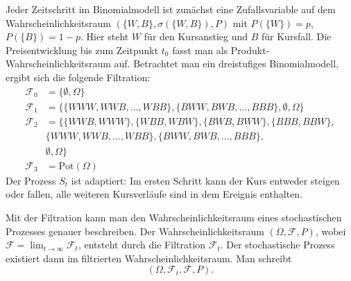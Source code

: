 \begin{bsp}
Jeder Zeitschritt im Binomialmodell ist zunächst eine Zufallsvariable auf dem 
Wahrscheinlichkeitsraum $(\{W, B\}, \sigma(\{W, B\}), P)$ mit 
$P(\{W \}) = p$, $P(\{B \}) = 1-p$. Hier steht $W$ für den Kursanstieg und $B$ für Kursfall. Die Preisentwicklung bis zum Zeitpunkt $t_0$ fasst man als Produkt-Wahrscheinlichkeitsraum auf.
Betrachtet man ein dreistufiges Binomialmodell, ergibt sich die folgende Filtration: 
$$
\begin{aligned}
\mathcal F_0 &= \{\emptyset, \Omega\} \\
\mathcal F_1 &= \{\{WWW, WWB, \dots, WBB \}, \{ BWW, BWB, \dots, BBB \},\emptyset, \Omega \} \\ 
\mathcal F_2 &= \{ \{WWB, WWW \}, \{WBB, WBW \}, \{BWB, BWW \}, \{BBB, BBW \}, \\ &\{WWW, WWB, \dots, WBB \}, \{ BWW, BWB, \dots, BBB \}, \\ &\emptyset, \Omega \} \\
\mathcal F_3 &= \text{Pot}(\Omega)
\end{aligned}
$$
Der Prozess $S_t$ ist adaptiert: Im ersten Schritt kann der Kurs entweder steigen oder
fallen, alle weiteren Kursverläufe sind in dem Ereignis enthalten.

\end{bsp}

\begin{defi}
Mit der Filtration kann man den Wahrscheinlichkeitsraum eines stochastischen Prozesses genauer beschreiben. 
Der Wahrscheinlichkeitsraum $(\Omega, \mathcal F, P)$, wobei $\mathcal F = \lim_{t \to \infty} \mathcal F_t$, entsteht durch die Filtration $\mathcal F_t$.
Der stochastische Prozess existiert dann im filtrierten Wahrscheinlichkeitsraum. Man schreibt
$$
(\Omega, \mathcal F_t, \mathcal F, P).
$$
\end{defi}

